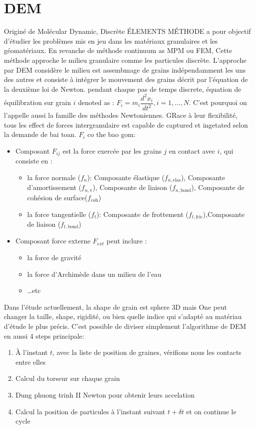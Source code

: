 \documentclass[a4paper,12pt]{report}
\begin{document}
\section{DEM}
Originé de Molécular Dynamic, Discrète ÉLEMENTS MÉTHODE a pour objectif d’étudier les problèmes mis en jeu dans les matériaux granulaires et les géomatériaux. En revanche de méthode continuum as MPM ou FEM, Cette méthode approche le milieu granulaire comme les particules discrète.
L’approche par DEM considère le milieu est assembmage de grains indépendamment les uns des autres et consiste à intégrer le mouvement des grains décrit par l’équation de la deuxième loi de Newton. pendant chaque pas de temps discrete, équation de équilibration sur grain $i$ denoted as : $F_i = m_i \dfrac{d^2x_i}{dt^2}, i = 1,\dots,N$.  
C’est pourquoi on l’appelle aussi la famille des méthodes Newtoniennes.
GRace à leur flexibilité, tous les effect de forces intergranulaire est capable de captured et ingetated selon la demande de bai toan. $F_i$ co the bao gom:
\begin{itemize}[label=$\bullet$]
    \item Composant $F_{ij}$ est la force exercée par les grains $j$ en contact avec $i$, qui consiste en :
    \begin{itemize}[label=$\cdot$]
        \item la force normale ($f_n$): Composante élastique ($f_{n,\mathrm{elas}}$), Composante d’amortissement ($f_{n,\mathrm{v}}$), Composante de liaison ($f_{n,\mathrm{bond}}$), Composante de cohésion de surface($f_{\mathrm{coh}}$)
        \item la force tangentielle ($f_t$): Composante de frottement ($f_{t,\mathrm{fric}}$),Composante de liaison ($f_{t,\mathrm{bond}}$) 
    \end{itemize}
    \item Composant force externe $F_{ext}$ peut inclure :
    \begin{itemize}
        \item la force de gravité
        \item la force d'Archimède dans un milieu de l'eau
        \item \dots etc
    \end{itemize}
\end{itemize} 
Dans l'étude actuellement, la shape de grain est sphere 3D mais One peut changer la taille, shape, rigidité, ou bien quelle indice qui s'adapté au matériau d'étude le plus précis. 
C'est possible de diviser simplement l'algorithme de DEM en aussi 4 steps principale:
\begin{enumerate}
\item À l'instant $t$, avec la liste de position de graines, vérifions nous les contacts entre elles
\item Calcul du torseur sur chaque grain 
\item  Dung phuong trinh II Newton pour obtenir leurs accelation
\item Calcul la position de particules à l'instant suivant $t + \delta t$ et on continue le cycle
\end{enumerate}
\end{document}
